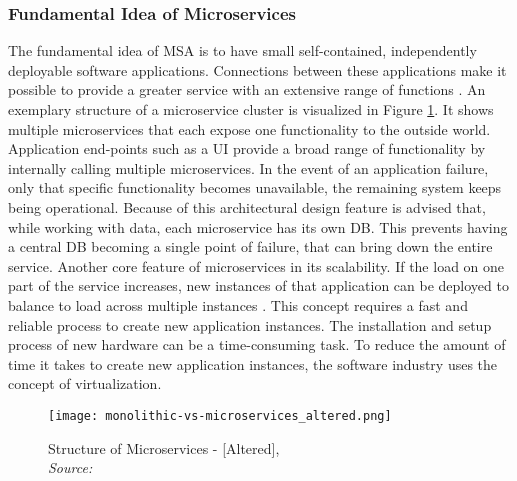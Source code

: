 \documentclass[12pt, a4paper]{article}
\begin{document}
        \subsubsection{Fundamental Idea of Microservices}\label{sssec::micro}
        The fundamental idea of \ac{MSA} is to have small self-contained, independently deployable software applications. Connections between these applications make it possible to provide a greater service with an extensive range of functions \cite{micro}. An exemplary structure of a microservice cluster is visualized in Figure \ref{fig::micro}. It shows multiple microservices that each expose one functionality to the outside world. Application end-points such as a \ac{UI} provide a broad range of functionality by internally calling multiple microservices. In the event of an application failure, only that specific functionality becomes unavailable, the remaining system keeps being operational. Because of this architectural design feature is advised that, while working with data, each microservice has its own \ac{DB}. This prevents having a central \acl{DB} becoming a single point of failure, that can bring down the entire service. Another core feature of microservices in its scalability. If the load on one part of the service increases, new instances of that application can be deployed to balance to load across multiple instances \cite{micro}. This concept requires a fast and reliable process to create new application instances.\newline
        The installation and setup process of new hardware can be a time-consuming task. To reduce the amount of time it takes to create new application instances, the software industry uses the concept of virtualization.

        \begin{figure}
            \centering
            \texttt{[image: monolithic-vs-microservices\_altered.png]}
            \caption{Structure of Microservices - [Altered], \\\textit{Source:~\cite{redhat_micro}}}\label{fig::micro}
        \end{figure}
\end{document}
